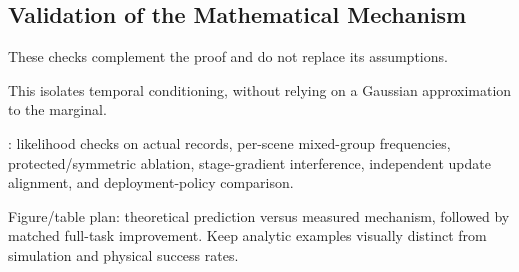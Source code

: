 \subsection{Validation of the Mathematical Mechanism}
\begin{outline}
\item {}
\item {} These checks complement the proof and do not replace its assumptions.
\item {} This isolates temporal conditioning, without relying on a Gaussian approximation to the marginal.
\item {}: likelihood checks on actual records, per-scene mixed-group frequencies, protected/symmetric ablation, stage-gradient interference, independent update alignment, and deployment-policy comparison.
\item Figure/table plan: theoretical prediction versus measured mechanism, followed by matched full-task improvement. Keep analytic examples visually distinct from simulation and physical success rates.
\end{outline}
